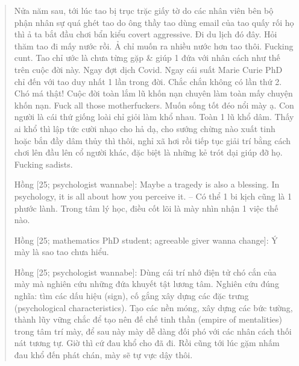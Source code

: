 \documentclass[12pt]{article}
\begin{document}
\begin{quote}
	Nửa năm sau, tới lúc tao bị trục trặc giấy tờ do các nhân viên bên bộ phận nhân sự quá ghét tao do ông thầy tao dùng email của tao quấy rối họ thì ả ta bắt đầu chơi bẩn kiểu covert aggressive. Đi du lịch đó đây. Hỏi thăm tao đi mấy nước rồi. Ả chỉ muốn ra nhiều nước hơn tao thôi. Fucking cunt. Tao chỉ ước là chưa từng gặp \& giúp 1 đứa với nhân cách như thế trên cuộc đời này. Ngay đợt dịch Covid. Ngay cái suất Marie Curie PhD chỉ đến với tao duy nhất 1 lần trong đời. Chắc chắn không có lần thứ 2. Chó má thật! Cuộc đời toàn lắm lũ khốn nạn chuyên làm toàn mấy chuyện khốn nạn. Fuck all those motherfuckers. Muốn sống tốt đéo nổi mày ạ. Con người là cái thứ giống loài chỉ giỏi làm khổ nhau. Toàn 1 lũ khổ dâm. Thấy ai khổ thì lập tức cười nhạo cho hả dạ, cho sướng chừng nào xuất tinh hoặc bắn đầy dâm thủy thì thôi, nghỉ xã hơi rồi tiếp tục giải trí bằng cách chơi lên đầu lên cổ người khác, đặc biệt là những kẻ trót dại giúp đỡ họ. Fucking sadists.
	
	{\sf Hồng [25; psychologist wannabe]}: Maybe a tragedy is also a blessing. In psychology, it is all about how you perceive it. -- Có thể 1 bi kịch cũng là 1 phước lành. Trong tâm lý học, điều cốt lõi là mày nhìn nhận 1 việc thế nào.
	
	{\sf Hồng [25; mathematics PhD student; agreeable giver wanna change]}: Ý mày là sao tao chưa hiểu.
	
	{\sf Hồng [25; psychologist wannabe]}: Dùng cái trí nhớ điện tử chó cắn của mày mà nghiên cứu những đứa khuyết tật lương tâm. Nghiên cứu đúng nghĩa: tìm các dấu hiệu (sign), cố gắng xây dựng các đặc trưng (psychological characteristics). Tạo các nền móng, xây dựng các bức tường, thành lũy vững chắc để tạo nên đế chế tinh thần (empire of mentalities) trong tâm trí mày, để sau này mày dễ dàng đối phó với các nhân cách thối nát tương tự. Giờ thì cứ đau khổ cho đã đi. Rồi cũng tới lúc gặm nhấm đau khổ đến phát chán, mày sẽ tự vực dậy thôi.
\end{quote}
\end{document}
